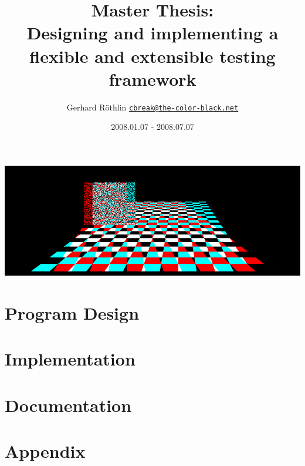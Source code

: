 \documentclass[12pt,twoside,bibtotoc]{scrartcl}
\title{Master Thesis: \mytitle\\
{\large Designing and implementing a flexible and extensible testing framework}}
\author{\normalsize Gerhard R\"othlin 
{\texttt{\href{mailto:cbreak@the-color-black.net}{cbreak@the-color-black.net}}}}
\date{2008.01.07 - 2008.07.07}
\begin{document}
\maketitle

\begin{center}
\includegraphics[width=15cm,clip,trim=0cm 0cm 0cm 0cm]{media/title.png}
\end{center}

\begin{multicols}{2}

\end{multicols}
\clearpage

\begin{multicols}{2}
\tableofcontents
\end{multicols}
\clearpage

\begin{multicols}{2}

\end{multicols}
\clearpage

\part{Program Design}
\begin{multicols}{2}


\end{multicols}
\clearpage

\part{Implementation}
\begin{multicols}{2}



\end{multicols}
\clearpage

\part{Documentation}
\begin{multicols}{2}


\end{multicols}
\clearpage

\appendix
\part{Appendix}


\end{document}
